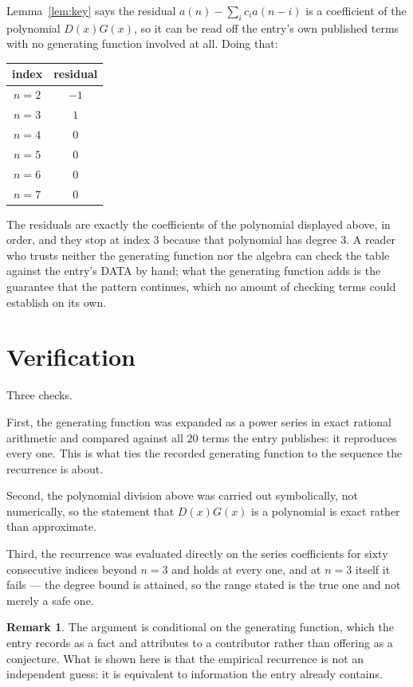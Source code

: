\documentclass[11pt,a4paper]{article}
\theoremstyle{plain}
\theoremstyle{definition}
\newtheorem{remark}[theorem]{Remark}
\begin{document}
Lemma~\ref{lem:key} says the residual $a(n)-\sum_ic_ia(n-i)$ is a coefficient of the
polynomial $D(x)G(x)$, so it can be read off the entry's own published terms with no
generating function involved at all. Doing that:
\begin{center}
\begin{tabular}{cc}
index & residual \\ \hline
$n=2$ & $-1$ \\
$n=3$ & $1$ \\
$n=4$ & $0$ \\
$n=5$ & $0$ \\
$n=6$ & $0$ \\
$n=7$ & $0$
\end{tabular}
\end{center}
The residuals are exactly the coefficients of the polynomial displayed above, in order, and
they stop at index $3$ because that polynomial has degree $3$. A reader who trusts
neither the generating function nor the algebra can check the table against the entry's DATA
by hand; what the generating function adds is the guarantee that the pattern continues, which
no amount of checking terms could establish on its own.

\section{Verification}

Three checks.

First, the generating function was expanded as a power series in exact rational arithmetic and
compared against all $20$ terms the entry publishes: it reproduces every one. This is
what ties the recorded generating function to the sequence the recurrence is about.

Second, the polynomial division above was carried out symbolically, not numerically, so the
statement that $D(x)G(x)$ is a polynomial is exact rather than approximate.

Third, the recurrence was evaluated directly on the series coefficients for sixty consecutive
indices beyond $n=3$ and holds at every one, and at $n=3$ itself it fails --- the
degree bound is attained, so the range stated is the true one and not merely a safe one.

\begin{remark}
The argument is conditional on the generating function, which the entry records as a fact and
attributes to a contributor rather than offering as a conjecture. What is shown here is that
the empirical recurrence is not an independent guess: it is equivalent to information the
entry already contains.
\end{remark}
\end{document}
